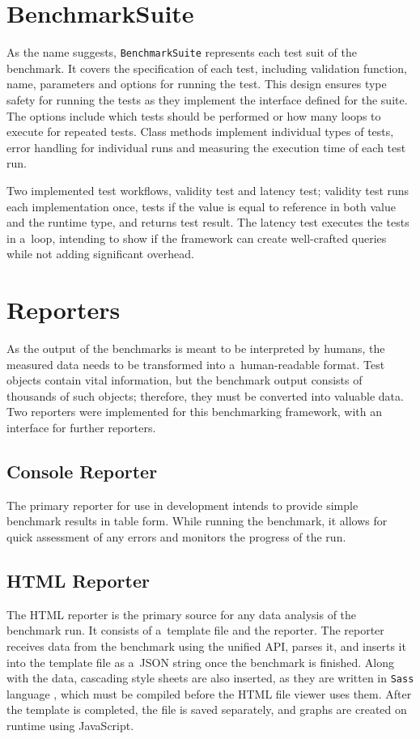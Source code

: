 \section{BenchmarkSuite}

As the name suggests, \texttt{BenchmarkSuite} represents each test suit of the
benchmark. It covers the specification of each test, including validation
function, name, parameters and options for running the test. This design ensures
type safety for running the tests as they implement the interface defined for
the suite. The options include which tests should be performed or how many loops
to execute for repeated tests. Class methods implement individual types of
tests, error handling for individual runs and measuring the execution time of
each test run.

Two implemented test workflows, validity test and latency test; validity test
runs each implementation once, tests if the value is equal to reference in both
value and the runtime type, and returns test result. The latency test executes
the tests in a~loop, intending to show if the framework can create well-crafted
queries while not adding significant overhead.

\section{Reporters}
As the output of the benchmarks is meant to be interpreted by humans, the
measured data needs to be transformed into a~human-readable format. Test objects
contain vital information, but the benchmark output consists of thousands of
such objects; therefore, they must be converted into valuable data. Two
reporters were implemented for this benchmarking framework, with an interface
for further reporters.

\subsection*{Console Reporter}
The primary reporter for use in development intends to provide simple benchmark
results in table form. While running the benchmark, it allows for quick
assessment of any errors and monitors the progress of the run.

\subsection*{HTML Reporter}
The HTML reporter is the primary source for any data analysis of the benchmark
run. It consists of a~template file and the reporter. The reporter receives data
from the benchmark using the unified API, parses it, and inserts it into the
template file as a~JSON string once the benchmark is finished. Along with the
data, cascading style sheets are also inserted, as they are written in
\texttt{Sass} language \cite{Sass}, which must be compiled before the HTML file
viewer uses them. After the template is completed, the file is saved separately,
and graphs are created on runtime using JavaScript.

